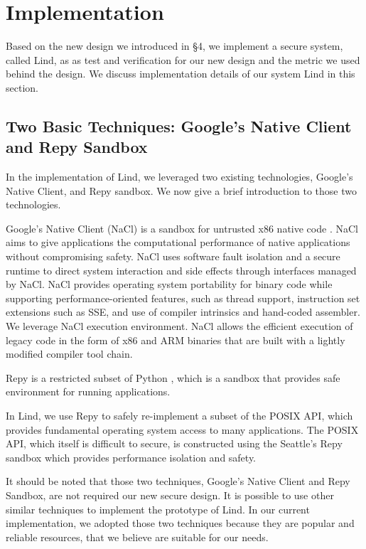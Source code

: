 \section{Implementation}
\label{sec.implementation}

Based on the new design we introduced in \S{4}, we implement a secure system, called Lind, as 
as test and verification for our new design and the metric we used behind the design. We discuss 
implementation details of our system Lind in this section. 

\subsection{Two Basic Techniques: Google's Native Client and Repy Sandbox}
In the implementation of Lind, we leveraged two existing technologies, Google's Native Client, 
and Repy sandbox. We now give a brief introduction to those two technologies.

Google's Native Client (NaCl) is a sandbox for untrusted x86 native code \cite{NaCl:09}. 
NaCl aims to give applications the computational performance of native applications 
without compromising safety. NaCl uses software fault isolation 
and a secure runtime to direct system interaction and side effects through interfaces managed by NaCl. 
NaCl provides operating system portability for binary code 
while supporting performance-oriented features, 
such as thread support, instruction set extensions such as SSE, and use of compiler intrinsics and 
hand-coded assembler. We leverage NaCl execution environment. NaCl allows the efficient execution of legacy code 
in the form of x86 and ARM binaries that are built with a lightly modified compiler tool chain.

Repy is a restricted subset of Python \cite{Repy:10}, which is a sandbox that 
provides safe environment for running applications.

In Lind, we use Repy to safely re-implement a subset of the POSIX API, which provides 
fundamental operating system access to many applications. The POSIX API, which itself is difficult to secure, 
is constructed using the Seattle's Repy sandbox which provides performance isolation and safety. 

It should be noted that those two techniques, Google's Native Client and Repy Sandbox, are not required
our new secure design. It is possible to use other similar techniques to implement the prototype of Lind. 
In our current implementation, we adopted those two techniques because they are popular and reliable 
resources, that we believe are suitable for our needs. 

